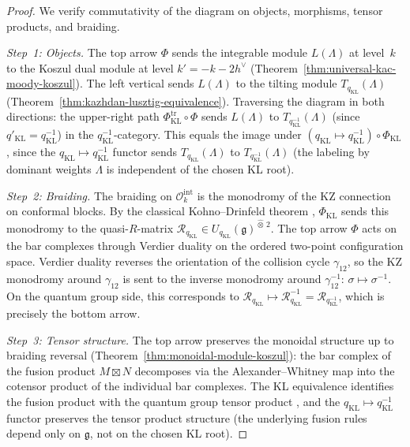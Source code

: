 \begin{proof}
We verify commutativity of the diagram on objects,
morphisms, tensor products, and braiding.

\emph{Step~1: Objects.}
The top arrow $\Phi$ sends the integrable module $L(\Lambda)$
at level~$k$ to the Koszul dual module at level $k' = -k - 2h^\vee$
(Theorem~\ref{thm:universal-kac-moody-koszul}). The left vertical sends
$L(\Lambda)$ to the tilting module $T_{q_{\mathrm{KL}}}(\Lambda)$
(Theorem~\ref{thm:kazhdan-lusztig-equivalence}). Traversing the
diagram in both directions: the upper-right path
$\Phi_{\mathrm{KL}}^{\mathrm{tr}}\circ\Phi$ sends $L(\Lambda)$ to
$T_{q_{\mathrm{KL}}^{-1}}(\Lambda)$
(since $q'_{\mathrm{KL}} = q_{\mathrm{KL}}^{-1}$) in the
$q_{\mathrm{KL}}^{-1}$-category. This equals the image under
$(q_{\mathrm{KL}} \mapsto q_{\mathrm{KL}}^{-1})
\circ \Phi_{\mathrm{KL}}$, since the
$q_{\mathrm{KL}} \mapsto q_{\mathrm{KL}}^{-1}$ functor sends
$T_{q_{\mathrm{KL}}}(\Lambda)$ to
$T_{q_{\mathrm{KL}}^{-1}}(\Lambda)$ (the labeling by dominant weights $\Lambda$
is independent of the chosen KL root).

\emph{Step~2: Braiding.}
The braiding on $\mathcal{O}_k^{\mathrm{int}}$ is the
monodromy of the KZ connection on conformal blocks. By the
classical Kohno--Drinfeld theorem \cite{Kohno87, Drinfeld90},
$\Phi_{\mathrm{KL}}$ sends this monodromy to the quasi-$R$-matrix
$\mathcal{R}_{q_{\mathrm{KL}}}
\in U_{q_{\mathrm{KL}}}(\mathfrak{g})^{\widehat{\otimes}\,2}$.
The top arrow $\Phi$ acts on the bar complexes through Verdier
duality on the ordered two-point configuration space. Verdier
duality reverses the orientation of the collision cycle
$\gamma_{12}$, so the KZ monodromy around $\gamma_{12}$ is sent to
the inverse monodromy around $\gamma_{12}^{-1}$:
$\sigma \mapsto \sigma^{-1}$.
On the quantum group side, this corresponds to
$\mathcal{R}_{q_{\mathrm{KL}}}
\mapsto \mathcal{R}_{q_{\mathrm{KL}}}^{-1}
=\mathcal{R}_{q_{\mathrm{KL}}^{-1}}$,
which is precisely the bottom arrow.

\emph{Step~3: Tensor structure.}
The top arrow preserves the monoidal structure up to braiding reversal
\textup{(}Theorem~\ref{thm:monoidal-module-koszul}\textup{)}:
the bar complex of the fusion product $M \boxtimes N$ decomposes via
the Alexander--Whitney map into the cotensor product of the
individual bar complexes.
The KL equivalence identifies the fusion product with the quantum group
tensor product \cite{KL93}, and the
$q_{\mathrm{KL}} \mapsto q_{\mathrm{KL}}^{-1}$ functor
preserves the tensor product structure (the underlying fusion rules
depend only on $\mathfrak{g}$, not on the chosen KL root).
\end{proof}

